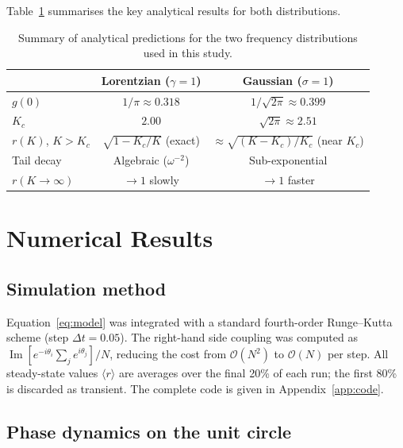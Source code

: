 \documentclass[12pt,a4paper]{article}
\begin{document}
Table~\ref{tab:summary} summarises the key analytical results for both
distributions.

\begin{table}[H]
  \centering
  \caption{Summary of analytical predictions for the two frequency
           distributions used in this study.}
  \label{tab:summary}
  \renewcommand{\arraystretch}{1.35}
  \begin{tabular}{lcc}
    \toprule
    & \textbf{Lorentzian} ($\gamma=1$) & \textbf{Gaussian} ($\sigma=1$) \\
    \midrule
    $g(0)$      & $1/\pi \approx 0.318$ & $1/\sqrt{2\pi} \approx 0.399$ \\
    $K_c$       & $2.00$                & $\sqrt{2\pi} \approx 2.51$ \\[2pt]
    $r(K)$, $K > K_c$ & $\sqrt{1-K_c/K}$ (exact) & $\approx\sqrt{(K-K_c)/K_c}$ (near $K_c$) \\
    Tail decay  & Algebraic ($\omega^{-2}$) & Sub-exponential \\
    $r(K\!\to\!\infty)$ & $\to 1$ slowly & $\to 1$ faster \\
    \bottomrule
  \end{tabular}
\end{table}

\section{Numerical Results}
\label{sec:results}

\subsection{Simulation method}

Equation~\eqref{eq:model} was integrated with a standard
fourth-order Runge--Kutta scheme (step $\Delta t = 0.05$).
The right-hand side coupling was computed as
$\operatorname{Im}[e^{-i\theta_i}\sum_j e^{i\theta_j}]/N$,
reducing the cost from $\mathcal{O}(N^2)$ to $\mathcal{O}(N)$ per step.
All steady-state values $\langle r \rangle$ are averages over the
final 20\% of each run; the first 80\% is discarded as transient.
The complete code is given in Appendix~\ref{app:code}.

\subsection{Phase dynamics on the unit circle}
\end{document}

